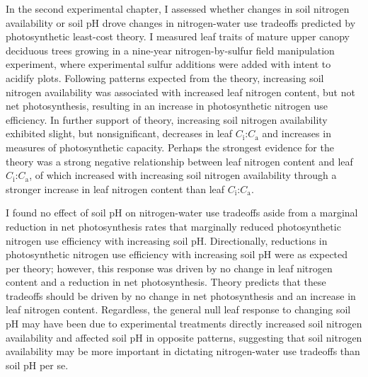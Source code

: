 In the second experimental chapter, I assessed whether changes in soil nitrogen availability or soil pH drove changes in nitrogen-water use tradeoffs predicted by photosynthetic least-cost theory. I measured leaf traits of mature upper canopy deciduous trees growing in a nine-year nitrogen-by-sulfur field manipulation experiment, where experimental sulfur additions were added with intent to acidify plots. Following patterns expected from the theory, increasing soil nitrogen availability was associated with increased leaf nitrogen content, but not net photosynthesis, resulting in an increase in photosynthetic nitrogen use efficiency. In further support of theory, increasing soil nitrogen availability exhibited slight, but nonsignificant, decreases in leaf $C_\mathrm{i}$:$C_\mathrm{a}$ and increases in measures of photosynthetic capacity. Perhaps the strongest evidence for the theory was a strong negative relationship between leaf nitrogen content and leaf $C_\mathrm{i}$:$C_\mathrm{a}$, of which increased with increasing soil nitrogen availability through a stronger increase in leaf nitrogen content than leaf $C_\mathrm{i}$:$C_\mathrm{a}$.

I found no effect of soil pH on nitrogen-water use tradeoffs aside from a marginal reduction in net photosynthesis rates that marginally reduced photosynthetic nitrogen use efficiency with increasing soil pH. Directionally, reductions in photosynthetic nitrogen use efficiency with increasing soil pH were as expected per theory; however, this response was driven by no change in leaf nitrogen content and a reduction in net photosynthesis. Theory predicts that these tradeoffs should be driven by no change in net photosynthesis and an increase in leaf nitrogen content. Regardless, the general null leaf response to changing soil pH may have been due to experimental treatments directly increased soil nitrogen availability and affected soil pH in opposite patterns, suggesting that soil nitrogen availability may be more important in dictating nitrogen-water use tradeoffs than soil pH per se.

